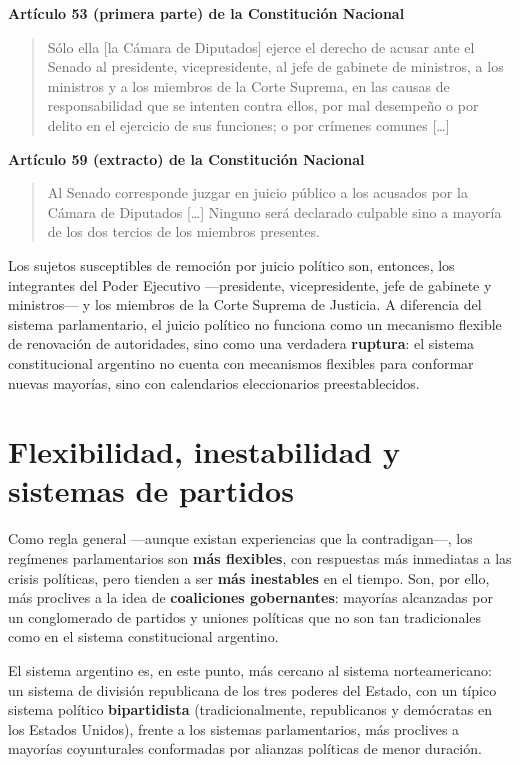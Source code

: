 \documentclass[12pt,oneside]{book}
\newenvironment{normacitada}[1]{%
    \medskip
    \noindent\textbf{#1}\par\smallskip
    \begin{quote}\itshape
}{%
    \end{quote}
    \medskip
}
\begin{document}
\begin{normacitada}{Artículo 53 (primera parte) de la Constitución Nacional}
Sólo ella [la Cámara de Diputados] ejerce el derecho de acusar ante el Senado al presidente, vicepresidente, al jefe de gabinete de ministros, a los ministros y a los miembros de la Corte Suprema, en las causas de responsabilidad que se intenten contra ellos, por mal desempeño o por delito en el ejercicio de sus funciones; o por crímenes comunes [\ldots]
\end{normacitada}

\begin{normacitada}{Artículo 59 (extracto) de la Constitución Nacional}
Al Senado corresponde juzgar en juicio público a los acusados por la Cámara de Diputados [\ldots] Ninguno será declarado culpable sino a mayoría de los dos tercios de los miembros presentes.
\end{normacitada}

Los sujetos susceptibles de remoción por juicio político son, entonces, los integrantes del Poder Ejecutivo —presidente, vicepresidente, jefe de gabinete y ministros— y los miembros de la Corte Suprema de Justicia. A diferencia del sistema parlamentario, el juicio político no funciona como un mecanismo flexible de renovación de autoridades, sino como una verdadera \textbf{ruptura}: el sistema constitucional argentino no cuenta con mecanismos flexibles para conformar nuevas mayorías, sino con calendarios eleccionarios preestablecidos.

\section{Flexibilidad, inestabilidad y sistemas de partidos}

Como regla general —aunque existan experiencias que la contradigan—, los regímenes parlamentarios son \textbf{más flexibles}, con respuestas más inmediatas a las crisis políticas, pero tienden a ser \textbf{más inestables} en el tiempo. Son, por ello, más proclives a la idea de \textbf{coaliciones gobernantes}: mayorías alcanzadas por un conglomerado de partidos y uniones políticas que no son tan tradicionales como en el sistema constitucional argentino.

El sistema argentino es, en este punto, más cercano al sistema norteamericano: un sistema de división republicana de los tres poderes del Estado, con un típico sistema político \textbf{bipartidista} (tradicionalmente, republicanos y demócratas en los Estados Unidos), frente a los sistemas parlamentarios, más proclives a mayorías coyunturales conformadas por alianzas políticas de menor duración.
\end{document}
